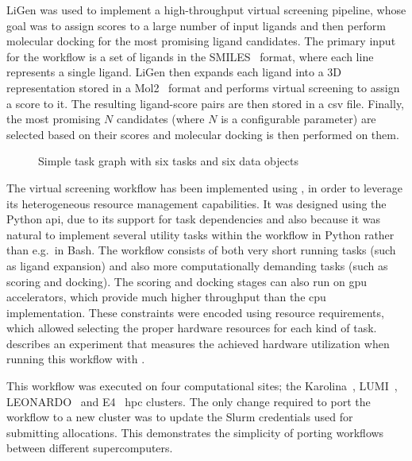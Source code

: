 LiGen was used to implement a high-throughput virtual screening pipeline, whose goal was to assign
scores to a large number of input ligands and then perform molecular docking for the most promising
ligand candidates. The primary input for the workflow is a set of ligands in the
SMILES~\cite{smiles} format, where each line represents a single ligand. LiGen then
expands each ligand into a 3D representation stored in a Mol2~\cite{mol2} format and
performs virtual screening to assign a score to it. The resulting ligand-score pairs are then
stored in a \gls{csv} file. Finally, the most promising $N$
candidates (where $N$ is a configurable parameter) are selected based on their
scores and molecular docking is then performed on them.

\begin{figure}[h]
	\centering
	\caption{Simple task graph with six tasks and six data objects}
	\label{fig:ligen-task-graph}
\end{figure}

The virtual screening workflow has been implemented using \hyperqueue{}, in order to
leverage its heterogeneous resource management capabilities. It was designed using the Python
\gls{api}, due to its support for task dependencies and also because it was natural
to implement several utility tasks within the workflow in Python rather than e.g.\ in Bash. The
workflow consists of both very short running tasks (such as ligand expansion) and also more
computationally demanding tasks (such as scoring and docking). The scoring and docking stages can
also run on \gls{gpu} accelerators, which provide much higher throughput than the
\gls{cpu} implementation. These constraints were encoded using
\hq{} resource requirements, which allowed selecting the proper hardware
resources for each kind of task.  describes an experiment that measures the
achieved hardware utilization when running this workflow with \hyperqueue{}.

This workflow was executed on four computational sites; the Karolina~\cite{karolina},
LUMI~\cite{lumi}, LEONARDO~\cite{leonardo} and E4~\cite{e4}
\gls{hpc} clusters. The only change required to port the workflow to a new cluster
was to update the Slurm credentials used for submitting allocations. This demonstrates the
simplicity of porting \hyperqueue{} workflows between different supercomputers.

